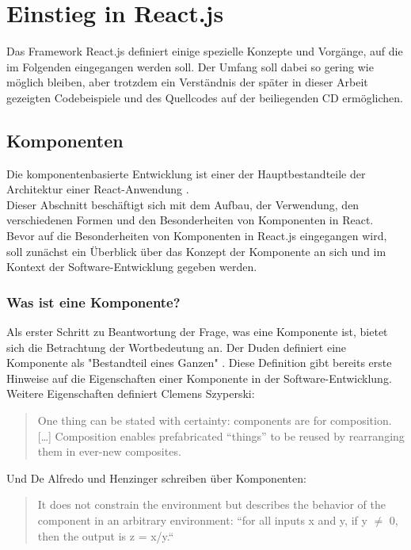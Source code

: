 \section{Einstieg in React.js}
Das Framework React.js definiert einige spezielle Konzepte und Vorgänge, auf die im Folgenden eingegangen werden soll. Der Umfang soll dabei so gering wie möglich bleiben, aber trotzdem ein Verständnis der später in dieser Arbeit gezeigten Codebeispiele und des Quellcodes auf der beiliegenden CD ermöglichen.

\subsection{Komponenten}
Die komponentenbasierte Entwicklung ist einer der Hauptbestandteile der Architektur einer React-Anwendung \cite[S. 28]{Gackenheimer201509}. \\
Dieser Abschnitt beschäftigt sich mit dem Aufbau, der Verwendung, den verschiedenen Formen und den Besonderheiten von Komponenten in React.\\
Bevor auf die Besonderheiten von Komponenten in React.js eingegangen wird, soll zunächst ein Überblick über das Konzept der Komponente an sich und im Kontext der Software-Entwicklung gegeben werden.

\subsubsection{Was ist eine Komponente?}
\label{chap:component}
Als erster Schritt zu Beantwortung der Frage, was eine Komponente ist, bietet sich die Betrachtung der Wortbedeutung an. Der Duden definiert eine Komponente als "Bestandteil eines Ganzen" \cite{Dudenredaktion2006}. Diese Definition gibt bereits erste Hinweise auf die Eigenschaften einer Komponente in der Software-Entwicklung.\\
Weitere Eigenschaften definiert Clemens Szyperski:

\begin{quote}
  One thing can be stated with certainty: components are for composition. […] Composition enables prefabricated “things” to be reused by rearranging them in ever-new composites. \cite{Szyperski200211}
\end{quote}

Und De Alfredo und Henzinger schreiben über Komponenten:

\begin{quote}
  It does not constrain the environment but describes the behavior of the component in an arbitrary environment: “for all inputs x and y, if y $\neq$ 0, then the output is z = x/y.“ \cite{de2001interface}
\end{quote}

